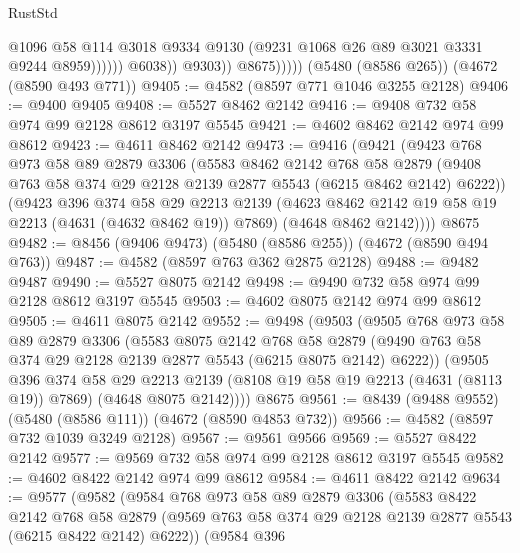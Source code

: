 \begin{lexlean}{RustStd}
\begin{coremodule}
                                @1096
                                @58
                                @114
                                @3018
                                @9334
                                @9130
                                (@9231 @1068 @26 @89 @3021 @3331 @9244 @8959))))))
                      @6038))
                  @9303))
              @8675)))))
    (@5480 (@8586 @265))
    (@4672 (@8590 @493 @771))
@9405 := @4582 (@8597 @771 @1046 @3255 @2128)
@9406 := @9400 @9405
@9408 := @5527 @8462 @2142
@9416 := @9408 @732 @58 @974 @99 @2128 @8612 @3197 @5545
@9421 := @4602 @8462 @2142 @974 @99 @8612
@9423 := @4611 @8462 @2142
@9473 := @9416
    (@9421
      (@9423
        @768
        @973
        @58
        @89
        @2879
        @3306
        (@5583
          @8462
          @2142
          @768
          @58
          @2879
          (@9408 @763 @58 @374 @29 @2128 @2139 @2877 @5543 (@6215 @8462 @2142) @6222))
        (@9423
          @396
          @374
          @58
          @29
          @2213
          @2139
          (@4623 @8462 @2142 @19 @58 @19 @2213 (@4631 (@4632 @8462 @19)) @7869)
          (@4648 @8462 @2142))))
    @8675
@9482 := @8456 (@9406 @9473) (@5480 (@8586 @255)) (@4672 (@8590 @494 @763))
@9487 := @4582 (@8597 @763 @362 @2875 @2128)
@9488 := @9482 @9487
@9490 := @5527 @8075 @2142
@9498 := @9490 @732 @58 @974 @99 @2128 @8612 @3197 @5545
@9503 := @4602 @8075 @2142 @974 @99 @8612
@9505 := @4611 @8075 @2142
@9552 := @9498
    (@9503
      (@9505
        @768
        @973
        @58
        @89
        @2879
        @3306
        (@5583
          @8075
          @2142
          @768
          @58
          @2879
          (@9490 @763 @58 @374 @29 @2128 @2139 @2877 @5543 (@6215 @8075 @2142) @6222))
        (@9505
          @396
          @374
          @58
          @29
          @2213
          @2139
          (@8108 @19 @58 @19 @2213 (@4631 (@8113 @19)) @7869)
          (@4648 @8075 @2142))))
    @8675
@9561 := @8439 (@9488 @9552) (@5480 (@8586 @111)) (@4672 (@8590 @4853 @732))
@9566 := @4582 (@8597 @732 @1039 @3249 @2128)
@9567 := @9561 @9566
@9569 := @5527 @8422 @2142
@9577 := @9569 @732 @58 @974 @99 @2128 @8612 @3197 @5545
@9582 := @4602 @8422 @2142 @974 @99 @8612
@9584 := @4611 @8422 @2142
@9634 := @9577
    (@9582
      (@9584
        @768
        @973
        @58
        @89
        @2879
        @3306
        (@5583
          @8422
          @2142
          @768
          @58
          @2879
          (@9569 @763 @58 @374 @29 @2128 @2139 @2877 @5543 (@6215 @8422 @2142) @6222))
        (@9584
          @396

\end{coremodule}
\end{lexlean}

